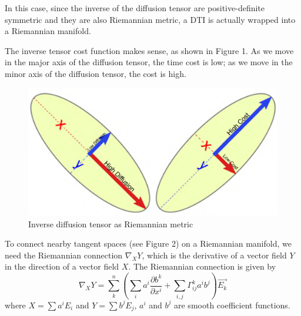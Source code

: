 \documentclass{article}
\theoremstyle{definition}
\theoremstyle{plain}
\begin{document}
In this case, since the inverse of the diffusion tensor are positive-definite symmetric and they are also Riemannian metric, a DTI is actually wrapped into a Riemannian manifold.

The inverse tensor cost function makes sense, as shown in Figure 1. As we move in the major axis of the diffusion tensor, the time cost is low; as we move in the minor axis of the diffusion tensor, the cost is high.
\begin{figure}[H]
   \centering
   \includegraphics[scale=0.3]{figure/diffusion.png}
   \caption{Inverse diffusion tensor as Riemannian metric}
\end{figure}

To connect nearby tangent spaces (see Figure 2) on a Riemannian manifold, we need the Riemannian connection $\nabla_XY$, which is the derivative of a vector field $Y$ in the direction of a vector field $X$. The Riemannian connection is given by
\begin{equation*}
    \nabla_XY=\sum_k^n\left(\sum_i a^i\frac{\partial b^k}{\partial x^i}+\sum_{i,j}\Gamma_{ij}^k a^i b^j\right)\vec{E_k}
\end{equation*}
where $X=\sum a^iE_i$ and $Y=\sum b^jE_j$, $a^i$ and $b^j$ are smooth coefficient functions.
\end{document}
